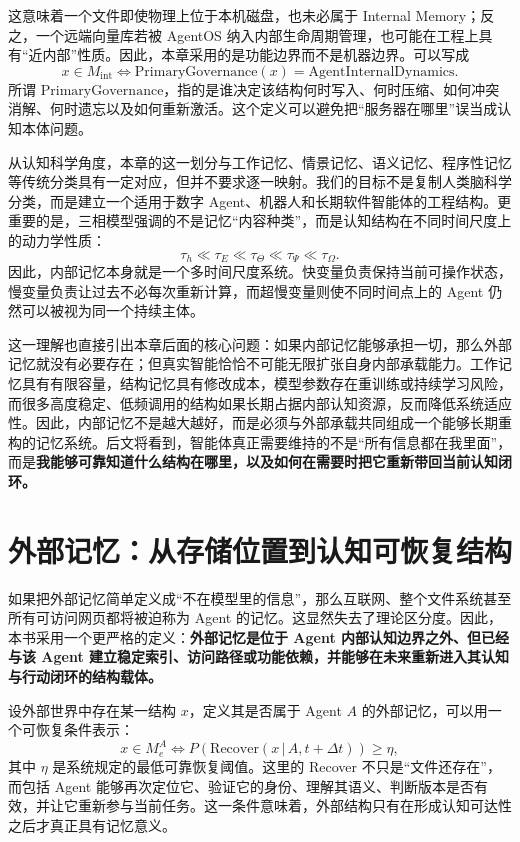 这意味着一个文件即使物理上位于本机磁盘，也未必属于 Internal Memory；反之，一个远端向量库若被 AgentOS 纳入内部生命周期管理，也可能在工程上具有``近内部''性质。因此，本章采用的是功能边界而不是机器边界。可以写成
\[
x\in M_{\mathrm{int}}
\iff
\mathrm{PrimaryGovernance}(x)=\mathrm{AgentInternalDynamics}.
\]
所谓 \(\mathrm{PrimaryGovernance}\)，指的是谁决定该结构何时写入、何时压缩、如何冲突消解、何时遗忘以及如何重新激活。这个定义可以避免把``服务器在哪里''误当成认知本体问题。

从认知科学角度，本章的这一划分与工作记忆、情景记忆、语义记忆、程序性记忆等传统分类具有一定对应，但并不要求逐一映射。我们的目标不是复制人类脑科学分类，而是建立一个适用于数字 Agent、机器人和长期软件智能体的工程结构。更重要的是，三相模型强调的不是记忆``内容种类''，而是认知结构在不同时间尺度上的动力学性质：
\[
\tau_h\ll\tau_E\ll\tau_\Theta\ll\tau_\Psi\ll\tau_\Omega.
\]
因此，内部记忆本身就是一个多时间尺度系统。快变量负责保持当前可操作状态，慢变量负责让过去不必每次重新计算，而超慢变量则使不同时间点上的 Agent 仍然可以被视为同一个持续主体。

这一理解也直接引出本章后面的核心问题：如果内部记忆能够承担一切，那么外部记忆就没有必要存在；但真实智能恰恰不可能无限扩张自身内部承载能力。工作记忆具有有限容量，结构记忆具有修改成本，模型参数存在重训练或持续学习风险，而很多高度稳定、低频调用的结构如果长期占据内部认知资源，反而降低系统适应性。因此，内部记忆不是越大越好，而是必须与外部承载共同组成一个能够长期重构的记忆系统。后文将看到，智能体真正需要维持的不是``所有信息都在我里面''，而是\textbf{我能够可靠知道什么结构在哪里，以及如何在需要时把它重新带回当前认知闭环。}

\section{外部记忆：从存储位置到认知可恢复结构}

如果把外部记忆简单定义成``不在模型里的信息''，那么互联网、整个文件系统甚至所有可访问网页都将被迫称为 Agent 的记忆。这显然失去了理论区分度。因此，本书采用一个更严格的定义：\textbf{外部记忆是位于 Agent 内部认知边界之外、但已经与该 Agent 建立稳定索引、访问路径或功能依赖，并能够在未来重新进入其认知与行动闭环的结构载体。}

设外部世界中存在某一结构 \(x\)，定义其是否属于 Agent \(A\) 的外部记忆，可以用一个可恢复条件表示：
\[
x\in M_e^A
\iff
P\left(
\mathrm{Recover}(x\,|\,A,t+\Delta t)
\right)
\geq
\eta,
\]
其中 \(\eta\) 是系统规定的最低可靠恢复阈值。这里的 Recover 不只是``文件还存在''，而包括 Agent 能够再次定位它、验证它的身份、理解其语义、判断版本是否有效，并让它重新参与当前任务。这一条件意味着，外部结构只有在形成认知可达性之后才真正具有记忆意义。


